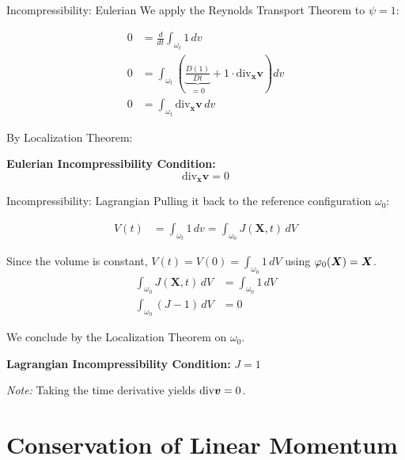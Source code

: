 \documentclass[aspectratio=169]{beamer}
\renewcommand{\vec}{\vectorsym}
\begin{document}
\begin{frame}{Incompressibility: Eulerian}
    We apply the Reynolds Transport Theorem to $\psi = 1$:
    
    \begin{align*}
        0 &= \frac{d}{dt} \int_{\omega_t} 1 \, dv \\
        0 &= \int_{\omega_t} \left( \underbrace{\frac{D(1)}{Dt}}_{=0} + 1 \cdot \text{div}_{\bm{x}} \bm{v} \right) dv \tag{Apply RTT} \\
        0 &= \int_{\omega_t} \text{div}_{\bm{x}} \bm{v} \, dv 
    \end{align*}
    
    By Localization Theorem:
    
    \vspace{0.2cm}
    \textbf{Eulerian Incompressibility Condition:}
    $$ \text{div}_{\bm{x}} \bm{v} = 0 $$
\end{frame}

\begin{frame}{Incompressibility: Lagrangian}
    Pulling it back to the reference configuration $\omega_0$:
    
    \begin{align*}
        V(t) &= \int_{\omega_t} 1 \, dv = \int_{\omega_0} J(\bm{X}, t) \, dV \tag{Pull-back using $dv = J dV$}
    \end{align*}
    
    Since the volume is constant, $V(t) = V(0)=\int_{\omega_0}1\,dV$ using $\varphi_0(\vec X) = \vec X$. 
    \begin{align*}
        \int_{\omega_0} J(\bm{X}, t) \, dV &= \int_{\omega_0} 1 \, dV \\
        \int_{\omega_0} (J - 1) \, dV &= 0
    \end{align*}
    
    We conclude by the Localization Theorem on $\omega_0$.
    
    \vspace{0.2cm}
    \textbf{Lagrangian Incompressibility Condition:} $ J = 1 $

    \textit{Note:} Taking the time derivative yields $\text{div}\vec v = 0$.
\end{frame}

\section{Conservation of Linear Momentum}
\end{document}
